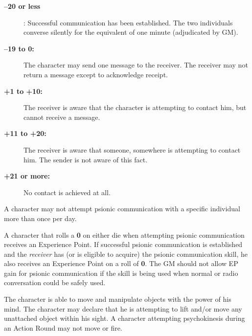 \begin{description}
\item[\textbf{--20 or less}]: Successful communication has been established.
  The two individuals converse silently for the equivalent of one
  minute (adjudicated by GM).
\item[\textbf{--19 to 0:}] The character may send one message to the receiver.
  The receiver may not return a message except to acknowledge receipt.
\item[\textbf{+1 to +10:}] The receiver is aware that the character is
  attempting to contact him, but cannot receive a message.
\item[\textbf{+11 to +20:}] The receiver is aware that someone, somewhere is
  attempting to contact him.  The sender is not aware of this fact.
\item[\textbf{+21 or more:}] No contact is achieved at all.
\end{description}

A character may not attempt psionic communication with a specific
individual more than once per day.  

A character that rolls a
\textbf{0} on either die when attempting psionic communication
receives an Experience Point.  If successful psionic communication is
established and the \emph{receiver} has (or is eligible to acquire) the
psionic communication skill, he also receives an Experience Point on a
roll of \textbf{0}.  The GM should not allow EP gain for psionic
communication if the skill is being used when normal or radio
conversation could be safely used.

\label{sec:skill-psychokinesis}

The character is able to move and manipulate objects with the power of
his mind.  The character may declare that he is attempting to lift
and/or move any unattached object within his sight.  A character
attempting psychokinesis during an Action Round may not move or fire.

